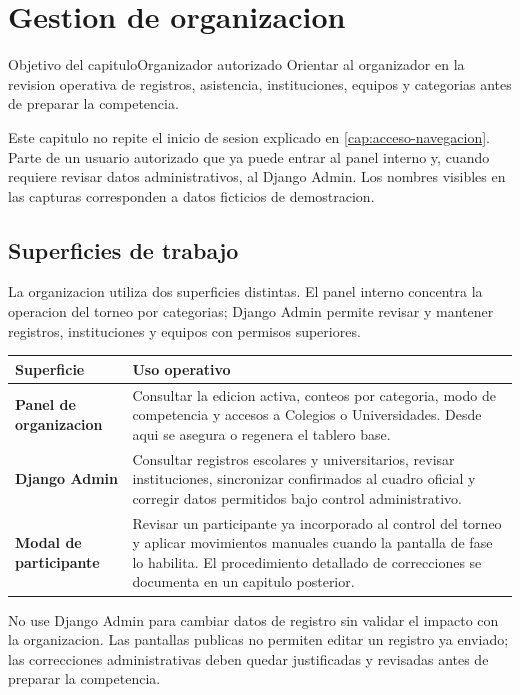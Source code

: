 \chapter{Gestion de organizacion}
\label{cap:gestion-organizacion}

\begin{procedimiento}{Objetivo del capitulo}{Organizador autorizado}
Orientar al organizador en la revision operativa de registros, asistencia, instituciones, equipos y categorias antes de preparar la competencia.
\end{procedimiento}

Este capitulo no repite el inicio de sesion explicado en \cref{cap:acceso-navegacion}. Parte de un usuario autorizado que ya puede entrar al panel interno y, cuando requiere revisar datos administrativos, al Django Admin. Los nombres visibles en las capturas corresponden a datos ficticios de demostracion.

\section{Superficies de trabajo}

La organizacion utiliza dos superficies distintas. El panel interno concentra la operacion del torneo por categorias; Django Admin permite revisar y mantener registros, instituciones y equipos con permisos superiores.

\begin{tabularx}{\linewidth}{>{\bfseries}p{3.6cm}X}
\toprule
Superficie & Uso operativo\\
\midrule
Panel de organizacion & Consultar la edicion activa, conteos por categoria, modo de competencia y accesos a Colegios o Universidades. Desde aqui se asegura o regenera el tablero base.\\
Django Admin & Consultar registros escolares y universitarios, revisar instituciones, sincronizar confirmados al cuadro oficial y corregir datos permitidos bajo control administrativo.\\
Modal de participante & Revisar un participante ya incorporado al control del torneo y aplicar movimientos manuales cuando la pantalla de fase lo habilita. El procedimiento detallado de correcciones se documenta en un capitulo posterior.\\
\bottomrule
\end{tabularx}

\begin{advertencia}
No use Django Admin para cambiar datos de registro sin validar el impacto con la organizacion. Las pantallas publicas no permiten editar un registro ya enviado; las correcciones administrativas deben quedar justificadas y revisadas antes de preparar la competencia.
\end{advertencia}

